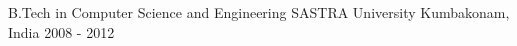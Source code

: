 

\begin{cventries}

  \cventry
    {B.Tech in Computer Science and Engineering} %
    {SASTRA University} %
    {Kumbakonam, India} %
    {2008 - 2012} %
    {}

\end{cventries}
